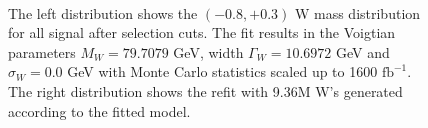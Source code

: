 \begin{figure}
\begin{minipage}{0.49\textwidth}
     \end{minipage}\\
     \caption{ The left distribution shows the $(-0.8,+0.3)$ W mass distribution for all signal after selection cuts. The fit results in the Voigtian parameters $M_W = 79.7079$ GeV, width $\Gamma_W = 10.6972$ GeV and $\sigma_W = 0.0$ GeV with Monte Carlo statistics scaled up to 1600 $\text{fb}^{-1}$. The right distribution shows the refit with 9.36M W's generated according to the fitted model.}
\label{fig:badfit}


\end{figure}


